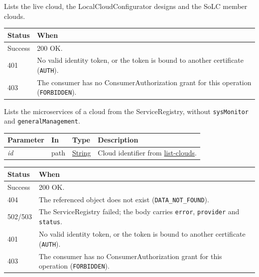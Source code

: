 \documentclass[a4paper]{arrowhead}
\newcommand{\fparam}[1]{\textit{\textcolor{ArrowheadBlue}{#1}}}
\newcommand{\oref}[1]{{\textcolor{ArrowheadBlue}{\hyperref[sec:operations:#1]{#1}}}}
\newcommand{\pref}[1]{{\textcolor{ArrowheadGrey}{\hyperref[sec:model:primitives:#1]{#1}}}}
\begin{document}
Lists the live cloud, the LocalCloudConfigurator designs and the SoLC member clouds.

{\small
\begin{longtable}{|p{2.0cm}|p{13.8cm}|}

\hline
\rowcolor{gray!33} Status & When \\ \hline
\endhead
Success & 200 OK. \\ \hline
401 & No valid identity token, or the token is bound to another certificate (\texttt{AUTH}). \\ \hline
403 & The consumer has no ConsumerAuthorization grant for this operation (\texttt{FORBIDDEN}). \\ \hline
\end{longtable}
}

Lists the microservices of a cloud from the ServiceRegistry, without \texttt{sysMonitor} and \texttt{generalManagement}.

{\small
\begin{longtable}{|p{3.0cm}|p{1.4cm}|p{3.2cm}|p{8.2cm}|}

\hline
\rowcolor{gray!33} Parameter & In & Type & Description \\ \hline
\endhead
\fparam{id} & path & \pref{String} & Cloud identifier from \oref{list-clouds}. \\ \hline
\end{longtable}
}


{\small
\begin{longtable}{|p{2.0cm}|p{13.8cm}|}

\hline
\rowcolor{gray!33} Status & When \\ \hline
\endhead
Success & 200 OK. \\ \hline
404 & The referenced object does not exist (\texttt{DATA\_NOT\_FOUND}). \\ \hline
502/503 & The ServiceRegistry failed; the body carries \texttt{error}, \texttt{provider} and \texttt{status}. \\ \hline
401 & No valid identity token, or the token is bound to another certificate (\texttt{AUTH}). \\ \hline
403 & The consumer has no ConsumerAuthorization grant for this operation (\texttt{FORBIDDEN}). \\ \hline
\end{longtable}
}
\end{document}
